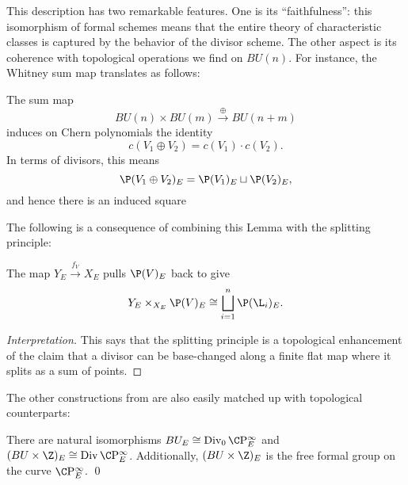 This description has two remarkable features.  One is its ``faithfulness'': this isomorphism of formal schemes means that the entire theory of characteristic classes is captured by the behavior of the divisor scheme.  The other aspect is its coherence with topological operations we find on $BU(n)$.  For instance, the Whitney sum map translates as follows:

\begin{lemma}\label{WhitneySumOfDivisors}
The sum map \[BU(n) \times BU(m) \xrightarrow\oplus BU(n+m)\] induces on Chern polynomials the identity \[c(V_1 \oplus V_2) = c(V_1) \cdot c(V_2).\]  In terms of divisors, this means \[\P(V_1 \oplus V_2)_E = \P(V_1)_E \sqcup \P(V_2)_E,\] and hence there is an induced square
\begin{center}
\end{center}
\end{lemma}

The following is a consequence of combining this Lemma with the splitting principle:

\begin{corollary}
The map $Y_E \xrightarrow{f_V} X_E$ pulls $\P(V)_E$ back to give \[Y_E \times_{X_E} \P(V)_E \cong \bigsqcup_{i=1}^n \P(\L_i)_E.\]
\end{corollary}
\begin{proof}[Interpretation]
This says that the splitting principle is a topological enhancement of the claim that a divisor can be base-changed along a finite flat map where it splits as a sum of points.
\end{proof}

The other constructions from  are also easily matched up with topological counterparts:

\begin{corollary}
There are natural isomorphisms $BU_E \cong \Div_0 \CP^\infty_E$ and $(BU \times \Z)_E \cong \Div \CP^\infty_E$. Additionally, $(BU \times \Z)_E$ is the free formal group on the curve $\CP^\infty_E$. \qed
\end{corollary}

